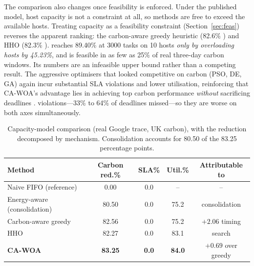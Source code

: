 \documentclass[12pt,a4paper]{article}
\providecommand{\DIFaddtex}[1]{{\protect\color{blue} \sf #1}} %
\providecommand{\DIFdeltex}[1]{{\protect\color{red} \scriptsize #1}} %
\providecommand{\DIFaddbegin}{} %
\providecommand{\DIFaddend}{} %
\providecommand{\DIFdelbegin}{} %
\providecommand{\DIFdelend}{} %
\providecommand{\DIFadd}[1]{\texorpdfstring{\DIFaddtex{#1}}{#1}} %
\providecommand{\DIFdel}[1]{\texorpdfstring{\DIFdeltex{#1}}{}} %
\providecommand{\DIFscaledelfig}{0.5}
\newlength{\DIFdelgraphicswidth} %
\newlength{\DIFdelgraphicsheight} %
\providecommand{\DIFaddincludegraphics}[2][]{{\color{blue}\fbox{\DIFOincludegraphics[#1]{#2}}}} %
\providecommand{\DIFdelincludegraphics}[2][]{%
\sbox{\DIFdelgraphicsbox}{\DIFOincludegraphics[#1]{#2}}%
\settoboxwidth{\DIFdelgraphicswidth}{\DIFdelgraphicsbox} %
\settoboxtotalheight{\DIFdelgraphicsheight}{\DIFdelgraphicsbox} %
\scalebox{\DIFscaledelfig}{%
\parbox[b]{\DIFdelgraphicswidth}{\usebox{\DIFdelgraphicsbox}\\[-\baselineskip] \rule{\DIFdelgraphicswidth}{0em}}\llap{\resizebox{\DIFdelgraphicswidth}{\DIFdelgraphicsheight}{%
\setlength{\unitlength}{\DIFdelgraphicswidth}%
\begin{picture}(1,1)%
\thicklines\linethickness{2pt} %
{\color[rgb]{1,0,0}\put(0,0){\framebox(1,1){}}}%
{\color[rgb]{1,0,0}\put(0,0){\line( 1,1){1}}}%
{\color[rgb]{1,0,0}\put(0,1){\line(1,-1){1}}}%
\end{picture}%
}\hspace*{3pt}}} %
} %
\DeclareRobustCommand{\DIFaddbegin}{\DIFOaddbegin \let\includegraphics\DIFaddincludegraphics} %
\DeclareRobustCommand{\DIFaddend}{\DIFOaddend \let\includegraphics\DIFOincludegraphics} %
\DeclareRobustCommand{\DIFdelbegin}{\DIFOdelbegin \let\includegraphics\DIFdelincludegraphics} %
\DeclareRobustCommand{\DIFdelend}{\DIFOaddend \let\includegraphics\DIFOincludegraphics} %
\begin{document}
\DIFadd{The comparison also changes once feasibility is enforced. Under the published model, host capacity is not a
constraint at all, so methods are free to exceed the available hosts. Treating capacity as a feasibility
constraint (Section~\ref{sec:feas}) reverses the apparent ranking: the }\DIFaddend carbon-aware greedy heuristic \DIFdelbegin \DIFdel{(82.6\% ) and HHO (82.3\% ). }\DIFdelend \DIFaddbegin \DIFadd{reaches
89.40\% at 3000 tasks on 10 hosts \emph{only by overloading hosts by 45.23\%}, and is feasible in as few as
25\% of real three-day carbon windows. Its numbers are an infeasible upper bound rather than a competing
result. }\DIFaddend The aggressive optimisers \DIFdelbegin \DIFdel{that
looked competitive on carbon }\DIFdelend (PSO, DE, GA) again incur substantial SLA \DIFdelbegin \DIFdel{violations and lower utilisation,
reinforcing that CA-WOA's advantage lies in achieving top carbon performance \emph{without} sacrificing
deadlines .
}%
\DIFdelend \DIFaddbegin \DIFadd{violations---33\% to 64\% of
deadlines missed---so they are worse on both axes simultaneously.
}\begin{table}[H]\centering
\caption{Capacity-model comparison (real Google trace, UK carbon), with the reduction decomposed by
mechanism. Consolidation accounts for 80.50 of the 83.25 percentage points.}\label{tab:capacity}
\begin{tabular}{lcccc}
\toprule Method & Carbon red.\% & SLA\% & Util.\% & Attributable to \\ \midrule
Naive FIFO (reference)       & 0.00           & 0.0           & --             & -- \\
Energy-aware (consolidation) & 80.50          & 0.0           & 75.2           & consolidation \\
Carbon-aware greedy          & 82.56          & 0.0           & 75.2           & $+2.06$ timing \\
HHO                          & 82.27          & 0.0           & 83.1           & search \\
\textbf{CA-WOA}              & \textbf{83.25} & \textbf{0.0}  & \textbf{84.0}  & $+0.69$ over greedy \\
\bottomrule
\end{tabular}
\end{table}
\end{document}
